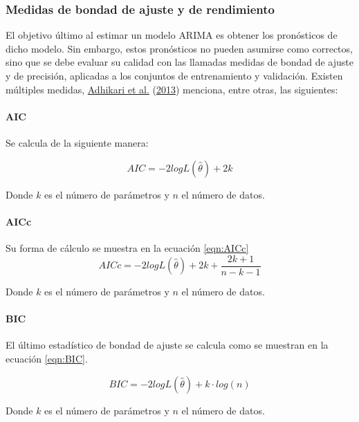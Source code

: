 \documentclass[
]{article}
\begin{document}
\subsubsection{Medidas de bondad de ajuste y de rendimiento}

El objetivo último al estimar un modelo ARIMA es obtener los pronósticos
de dicho modelo. Sin embargo, estos pronósticos no pueden asumirse como
correctos, sino que se debe evaluar su calidad con las llamadas medidas
de bondad de ajuste y de precisión, aplicadas a los conjuntos de
entrenamiento y validación. Existen múltiples medidas,
\protect\hyperlink{ref-medidas}{Adhikari et al.}
(\protect\hyperlink{ref-medidas}{2013}) menciona, entre otras, las
siguientes:

\paragraph{AIC}

Se calcula de la siguiente manera:

\begin{equation}
\label{eqn:AIC}
AIC=-2logL\left(\hat\theta\right)+2k
\end{equation}

Donde \(k\) es el número de parámetros y \(n\) el número de datos.

\paragraph{AICc}

Su forma de cálculo se muestra en la ecuación \ref{eqn:AICc}
\begin{equation}
\label{eqn:AICc}
AICc=-2logL\left(\hat\theta\right)+2k+\frac{2k+1}{n-k-1}
\end{equation}

Donde \(k\) es el número de parámetros y \(n\) el número de datos.

\paragraph{BIC}

El último estadístico de bondad de ajuste se calcula como se muestran en
la ecuación \ref{eqn:BIC}.

\begin{equation}
\label{eqn:BIC}
BIC=-2logL\left(\hat\theta\right)+k\cdot log(n)
\end{equation}

Donde \(k\) es el número de parámetros y \(n\) el número de datos.
\end{document}
